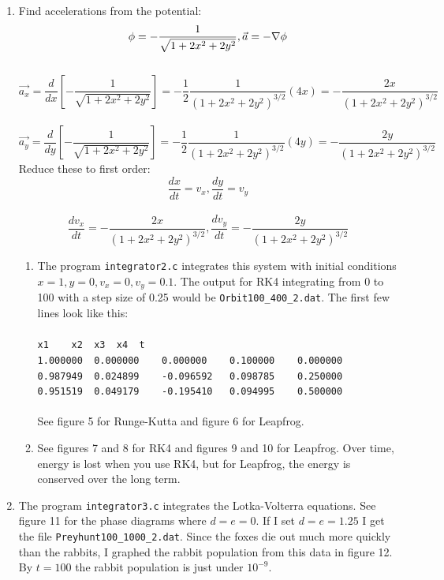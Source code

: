 \documentclass[11pt]{article}
\begin{document}
\begin{enumerate}
\begin{enumerate}
\end{enumerate}
\newpage
\item Find accelerations from the potential:
\begin{displaymath}
\phi = -\frac{1}{\sqrt{1+2x^2+2y^2}}, \vec{a} = -\nabla\phi\\
\end{displaymath}\\
\begin{displaymath}
\vec{a_x} = \frac{d}{dx}[-\frac{1}{\sqrt{1+2x^2+2y^2}}] = -\frac{1}{2}\frac{1}{(1+2x^2+2y^2)^{3/2}}(4x) = -\frac{2x}{(1+2x^2+2y^2)^{3/2}}
\end{displaymath}\\
\begin{displaymath} \vec{a_y} = \frac{d}{dy}[-\frac{1}{\sqrt{1+2x^2+2y^2}}] = -\frac{1}{2}\frac{1}{(1+2x^2+2y^2)^{3/2}}(4y) = -\frac{2y}{(1+2x^2+2y^2)^{3/2}}
\end{displaymath}
Reduce these to first order:
\begin{displaymath}
\frac{dx}{dt} = v_x, \frac{dy}{dt} = v_y
\end{displaymath}\\
\begin{displaymath}
\frac{dv_x}{dt} =  -\frac{2x}{(1+2x^2+2y^2)^{3/2}}, \frac{dv_y}{dt} =  -\frac{2y}{(1+2x^2+2y^2)^{3/2}}
\end{displaymath}
\begin{enumerate}
\item The program \verb"integrator2.c" integrates this system with initial conditions $x = 1, y = 0, v_x = 0, v_y = 0.1$.  The output for RK4 integrating from 0 to 100 with a step size of 0.25 would be \verb"Orbit100_400_2.dat".  The first few lines look like this:\\
\\
\verb"x1	x2	x3	x4	t"\\
\verb"1.000000	0.000000	0.000000	0.100000	0.000000"\\
\verb"0.987949	0.024899	-0.096592	0.098785	0.250000"\\
\verb"0.951519	0.049179	-0.195410	0.094995	0.500000"\\
\\ See figure 5 for Runge-Kutta and figure 6 for Leapfrog.
\item See figures 7 and 8 for RK4 and figures 9 and 10 for Leapfrog.  Over time, energy is lost when you use RK4, but for Leapfrog, the energy is conserved over the long term.
\end{enumerate}
\item The program \verb"integrator3.c" integrates the Lotka-Volterra equations.  See figure 11 for the phase diagrams where $d = e = 0$.  If I set $d = e = 1.25$ I get the file \verb"Preyhunt100_1000_2.dat".  Since the foxes die out much more quickly than the rabbits, I graphed the rabbit population from this data in figure 12.  By $t = 100$ the rabbit population is just under $10^{-9}$.

\end{enumerate}
\end{document}
